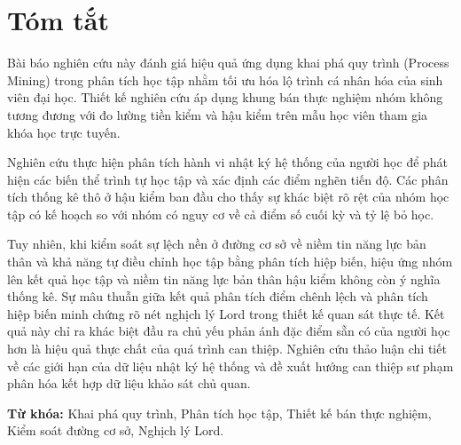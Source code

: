\section*{Tóm tắt}

Bài báo nghiên cứu này đánh giá hiệu quả ứng dụng khai phá quy trình (Process Mining) trong phân tích học tập nhằm tối ưu hóa lộ trình cá nhân hóa của sinh viên đại học. Thiết kế nghiên cứu áp dụng khung bán thực nghiệm nhóm không tương đương với đo lường tiền kiểm và hậu kiểm trên mẫu học viên tham gia khóa học trực tuyến. 

Nghiên cứu thực hiện phân tích hành vi nhật ký hệ thống của người học để phát hiện các biến thể trình tự học tập và xác định các điểm nghẽn tiến độ. Các phân tích thống kê thô ở hậu kiểm ban đầu cho thấy sự khác biệt rõ rệt của nhóm học tập có kế hoạch so với nhóm có nguy cơ về cả điểm số cuối kỳ và tỷ lệ bỏ học. 

Tuy nhiên, khi kiểm soát sự lệch nền ở đường cơ sở về niềm tin năng lực bản thân và khả năng tự điều chỉnh học tập bằng phân tích hiệp biến, hiệu ứng nhóm lên kết quả học tập và niềm tin năng lực bản thân hậu kiểm không còn ý nghĩa thống kê. Sự mâu thuẫn giữa kết quả phân tích điểm chênh lệch và phân tích hiệp biến minh chứng rõ nét nghịch lý Lord trong thiết kế quan sát thực tế. Kết quả này chỉ ra khác biệt đầu ra chủ yếu phản ánh đặc điểm sẵn có của người học hơn là hiệu quả thực chất của quá trình can thiệp. Nghiên cứu thảo luận chi tiết về các giới hạn của dữ liệu nhật ký hệ thống và đề xuất hướng can thiệp sư phạm phân hóa kết hợp dữ liệu khảo sát chủ quan.

\vspace{0.5cm}
\noindent \textbf{Từ khóa:} Khai phá quy trình, Phân tích học tập, Thiết kế bán thực nghiệm, Kiểm soát đường cơ sở, Nghịch lý Lord.

